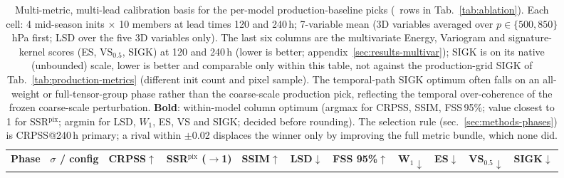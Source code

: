 \begin{table}
  \centering
  \scriptsize
  \setlength{\tabcolsep}{2.5pt}
  \renewcommand{\arraystretch}{1.15}
  \caption{Multi-metric, multi-lead calibration basis for the per-model
           production-baseline picks (\winner\ rows in
           Tab.~\ref{tab:ablation}).
           Each cell: 4 mid-season inits $\times$ 10 members at lead times
           120 and 240\,h; 7-variable mean (3D variables averaged over
           $p \in \{500, 850\}$ hPa first; LSD over the five 3D variables only). The last six columns are the
           multivariate Energy, Variogram and signature-kernel scores (ES,
           VS$_{0.5}$, SIGK) at 120 and 240\,h (lower is better;
           appendix~\ref{sec:results-multivar}); SIGK is on its native
           (unbounded) scale, lower is better and comparable only within this
           table, not against the production-grid SIGK of
           Tab.~\ref{tab:production-metrics} (different init count and pixel
           sample).
           The temporal-path SIGK optimum often
           falls on an all-weight or full-tensor-group phase rather than the
           coarse-scale production pick, reflecting the temporal
           over-coherence of the frozen coarse-scale perturbation.
           \textbf{Bold}: within-model column optimum (argmax for CRPSS,
           SSIM, FSS\,95\%; value closest to 1 for SSR$^{\mathrm{pix}}$; argmin for LSD, $W_1$,
           ES, VS and SIGK; decided before rounding). The selection rule (sec.~\ref{sec:methods-phases})
           is CRPSS@240\,h primary; a rival within $\pm$0.02 displaces the
           winner only by improving the full metric bundle, which none did.}
  \label{tab:calibration}
  \begin{tabular}{@{}l l rr rr rr rr rr rr rr rr rr@{}}
    \toprule
    \multirow{2}{*}{\textbf{Phase}}
        & \multirow{2}{*}{\textbf{$\sigma$ / config}}
        & \multicolumn{2}{c}{\textbf{CRPSS$\uparrow$}}
        & \multicolumn{2}{c}{\textbf{SSR$^{\mathrm{pix}}$ ($\to$1)}}
        & \multicolumn{2}{c}{\textbf{SSIM$\uparrow$}}
        & \multicolumn{2}{c}{\textbf{LSD$\downarrow$}}
        & \multicolumn{2}{c}{\textbf{FSS 95\%$\uparrow$}}
        & \multicolumn{2}{c}{\textbf{W$_{1}\downarrow$}}
        & \multicolumn{2}{c}{\textbf{ES$\downarrow$}}
        & \multicolumn{2}{c}{\textbf{VS$_{0.5}\downarrow$}}
        & \multicolumn{2}{c}{\textbf{SIGK$\downarrow$}} \\
    \cmidrule(lr){3-4} \cmidrule(lr){5-6} \cmidrule(lr){7-8} \cmidrule(lr){9-10} \cmidrule(lr){11-12} \cmidrule(lr){13-14} \cmidrule(lr){15-16} \cmidrule(lr){17-18} \cmidrule(lr){19-20}

\end{tabular}
\end{table}
